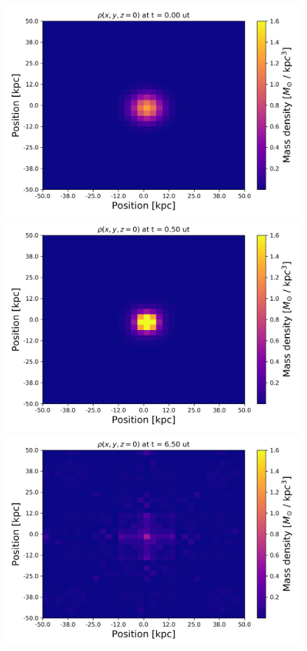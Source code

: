 {\begin{figure}[h!]
    \centering
    \includegraphics[scale=0.4]{imag/3dDens0.png}
    \includegraphics[scale=0.4]{imag/3dDens1.png}
    \includegraphics[scale=0.4]{imag/3dDens13.png}

\end{figure}}

